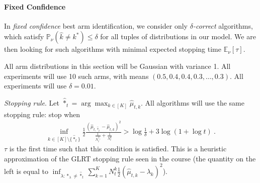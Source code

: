 \begin{questions}

\end{questions}

\paragraph{Fixed Confidence}
\label{par:fixed_confidence}

In \emph{fixed confidence} best arm identification, we consider only \emph{$\delta$-correct} algorithms, which satisfy $\mathbb{P}_\nu(\hat{k} \ne k^*) \le \delta$ for all tuples of distributions in our model. We are then looking for such algorithms with minimal expected stopping time $\mathbb{E}_\nu[\tau]$.

All arm distributions in this section will be Gaussian with variance 1. All experiments will use 10 such arms, with means $(0.5, 0.4, 0.4, 0.3, \ldots, 0.3)$. All experiments will use $\delta = 0.01$.

\emph{Stopping rule}. Let $\hat{*}_t = \arg\max_{k \in [K]} \hat{\mu}_{t,k}$. All algorithms will use the same stopping rule: stop when
\begin{align*}
\inf_{k \in [K] \setminus \{\hat{*}_t\}} \frac{1}{2} \frac{(\hat{\mu}_{t,\hat{*}_t} - \hat{\mu}_{t,k})^2}{\frac{1}{N_t^{\hat{*}_t}}+\frac{1}{N_t^k}}
> \log \frac{1}{\delta} + 3 \log (1 + \log t) \: .
\end{align*}
$\tau$ is the first time such that this condition is satisfied.
This is a heuristic approximation of the GLRT stopping rule seen in the course (the quantity on the left is equal to $\inf_{\lambda : *_\lambda \ne \hat{*}_t} \sum_{k=1}^K N_t^k \frac{1}{2}(\hat{\mu}_{t,k} -\lambda_{k})^2$).

